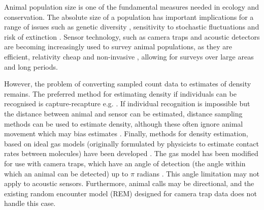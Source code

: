 \documentclass[a4paper,10pt,reqno,oneside]{amsart}
\begin{document}
Animal population size is one of the fundamental measures needed in ecology and conservation. The absolute size of a population has important implications for a range of issues such as genetic diversity \citep{o1985genetic, fischer2000genetic, willi2005threefold}, sensitivity to stochastic fluctuations \citep{richter1972extinction,wright1983stochastic} and risk of extinction \citep{purvis2000predicting}. Sensor technology, such as camera traps \citep{rowcliffe2008surveys,ahumada2011community} and acoustic detectors \citep{ofarrel1999comparison,mellinger2007fixed,jones2011indicator} are becoming increasingly used to survey animal populations, as they are efficient, relativity cheap and non-invasive \citep{gese2001monitoring, o2003crouching, silveira2003camera}, allowing for surveys over large areas and long periods. 

However, the problem of converting sampled count data to estimates of density remains. The preferred method for estimating density if individuals can be recognised is capture-recapture e.g. \citep{karanth1995, trolle2003estimation, soisalo2006estimating, trolle2007camera}. If individual recognition is impossible but the distance between animal and sensor can be estimated, distance sampling methods can be used to estimate density, although these often ignore animal movement which may bias estimates \citep{barlow2005estimates, marques2011estimating}. Finally, methods for density estimation, based on ideal gas models (originally formulated by physicists to estimate contact rates between molecules) have been developed \citep{yapp1956theory, Hutchinson_Waser_2007}. The gas model has been modified for use with camera traps, which have an angle of detection (the angle within which an animal can be detected)  up to $\pi$ radians \citep{rowcliffe2008estimating}. This angle limitation may not apply to acoustic sensors. Furthermore, animal calls may be directional, and the existing random encounter model (REM) designed for camera trap data does not handle this case.

\end{document}

